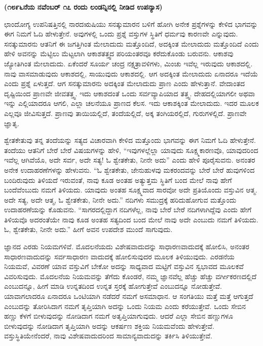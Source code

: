 \begin{center}
\textbf{(೧೮೯೬ನೆಯ ನವೆಂಬರ್​ ೧೭ ರಂದು ಲಂಡನ್ನಿನಲ್ಲಿ ನೀಡಿದ ಉಪನ್ಯಾಸ)}
\end{center}

ಛಾಂದೋಗ್ಯ ಉಪನಿಷತ್ತಿನಲ್ಲಿ ನಾರದಋಷಿಯು ಸನತ್ಕುಮಾರನ ಬಳಿಗೆ ಹೋಗಿ ಅನೇಕ ಪ್ರಶ್ನೆಗಳನ್ನು ಕೇಳಿದ ಭಾಗವನ್ನು ಈಗ ನಿಮಗೆ ಓದಿ ಹೇಳುತ್ತೇನೆ. ಅವುಗಳಲ್ಲಿ ಒಂದು ಪ್ರಶ್ನೆ ವಸ್ತುಗಳ ಸ್ಥಿತಿಗೆ ಧರ್ಮವು ಕಾರಣವೇ ಎನ್ನುವುದು. ಸನತ್ಕುಮಾರನು ಆತನಿಗೆ ಈ ಜಗತ್ತಿಗಿಂತ ಮೇಲಾದುದು ಮತ್ತೊಂದಿದೆ, ಅದಕ್ಕಿಂತ ಮೇಲಾದುದು ಮತ್ತೊಂದಿದೆ ಎಂದು ಹೇಳಿ ಅವನನ್ನು ಮೆಟ್ಟಿಲು ಮೆಟ್ಟಲಾಗಿ ಆಕಾಶತತ್ತ್ವದ ಪರಿಯಂತರವೂ ಕರೆದುಕೊಂಡು ಬರುವನು. ಆಕಾಶವು ಜ್ಯೋತಿಗಿಂತ ಮೇಲಾದುದು. ಏಕೆಂದರೆ ಸೂರ್ಯ ಚಂದ್ರ ನಕ್ಷತ್ರಾವಳಿಗಳು, ಮಿಂಚು ಇವೆಲ್ಲ ಇರುವುದು ಆಕಾಶದಲ್ಲಿ. ನಾವು ವಾಸಮಾಡುವುದು ಆಕಾಶದಲ್ಲಿ, ಸಾಯುವುದು ಆಕಾಶದಲ್ಲಿ. ಆಗ ಅದಕ್ಕಿಂತ ಮೇಲಾದುದು ಏನಾದರೂ ಇದೆಯೆ ಎಂದು ಪ್ರಶ್ನೆ ಏಳುತ್ತದೆ. ಆಗ ಸನತ್ಕುಮಾರನು ಅದಕ್ಕಿಂತ ಮೇಲಾದುದು ಪ್ರಾಣ ಎಂದು ಹೇಳುತ್ತಾನೆ. ವೇದಾಂತದ ದೃಷ್ಟಿಯಿಂದ ಪ್ರಾಣವೇ ಜೀವತತ್ತ್ವ. ಇದು ಆಕಾಶದಂತೆ ಒಂದು ಸರ್ವವ್ಯಾಪಿಯಾದ ತತ್ತ್ವ. ದೇಹದಲ್ಲಿಯಾಗಲೀ ಅಥವಾ ಇನ್ನು ಎಲ್ಲಿಯಾದರೂ ಆಗಲಿ, ಎಲ್ಲಾ ಚಲನೆಯೂ ಪ್ರಾಣದ ಕೆಲಸ. ಇದು ಆಕಾಶಕ್ಕಿಂತ ಮೇಲಾದುದು. ಇದರ ಮೂಲಕ ಎಲ್ಲವೂ ಜೀವಿಸುತ್ತದೆ. ಪ್ರಾಣವು ತಾಯಿಯಲ್ಲಿದೆ, ತಂದೆಯಲ್ಲಿದೆ, ಅಕ್ಕ ತಂಗಿಯರಲ್ಲಿದೆ, ಗುರುಗಳಲ್ಲಿದೆ. ಪ್ರಾಣವೇ ಜ್ಞಾತೃ.

ಶ್ವೇತಕೇತುವು ತನ್ನ ತಂದೆಯನ್ನು ಸತ್ಯದ ವಿಚಾರವಾಗಿ ಕೇಳಿದ ಮತ್ತೊಂದು ಭಾಗವನ್ನು ಈಗ ನಿಮಗೆ ಓದಿ ಹೇಳುತ್ತೇನೆ. ತಂದೆಯು ಆತನಿಗೆ ಬೇರೆ ಬೇರೆ ವಿಷಯಗಳನ್ನು ಹೇಳಿ, “ಇವುಗಳಲ್ಲೆಲ್ಲಾ ಯಾವುದು ಸೂಕ್ಷ್ಮಕಾರಣವೊ, ಯಾವುದರಿಂದ ಇವೆಲ್ಲ ಆಗಿವೆಯೊ, ಅದೇ ಸರ್ವ, ಅದೇ ಸತ್ಯ! ಓ ಶ್ವೇತಕೇತು, ನೀನೇ ಅದು” ಎಂದು ಹೇಳಿ ಪೂರೈಸುವನು. ಅನಂತರ ಅನೇಕ ಉದಾಹರಣೆಗಳನ್ನು ಹೇಳುವನು. “ಓ ಶ್ವೇತಕೇತು, ಜೇನುಹುಳವು ಮಕರಂದವನ್ನು ಬೇರೆ ಬೇರೆ ಹುವುಗಳಿಂದ ಬಂದಿರುವುದು ತಿಳಿಯದೆ ಇರುವಂತೆ, ನಾವು ಕೂಡ ಅಂತಹ ಅತ್ಯುತ್ತಮ ಸ್ಥಿತಿಗೆ ಬಂದ ಮೇಲೆ ನಾವು ಹೇಗೆ ಬಂದೆವೆಂಬುದು ನಮಗೆ ತಿಳಿಯದು. ಯಾವುದು ಅಂತಹ ಸೂಕ್ಷ್ಮವಾದ ಸಾರವೋ ಅದೇ ಪ್ರತಿಯೊಂದು ವಸ್ತುವಿನ ಆತ್ಮ. ಅದೇ ಸತ್ಯ, ಅದೇ ಆತ್ಮ, ಓ ಶ್ವೇತಕೇತು, ನೀನೇ ಅದು.” ನದಿಗಳು ಸಮುದ್ರಕ್ಕೆ ಹರಿದುಹೋಗುವ ಮತ್ತೊಂದು ಉದಾಹರಣೆಯನ್ನು ಕೊಡುವನು. “ಸಾಗರದಲ್ಲಿದ್ದಾಗ ನದಿಗಳೆಲ್ಲ, ನಾವು ಬೇರೆ ಬೇರೆ ನದಿಗಳಾಗಿದ್ದೆವು ಎಂದು ಹೇಗೆ ತಿಳಿಯವೊ ಅದರಂತೆಯೇ ನಾವು ಕೂಡ ಅಂತಹ ಸತ್ಯದಿಂದ ಬಂದ ಮೇಲೆ ನಾವು ಅದೇ ಎಂಬುದು ನಮಗೆ ತಿಳಿಯದು. ಓ, ಶ್ವೇತಕೇತು, ನೀನೇ ಅದು.” ಹೀಗೆ ಅವನ ಉಪದೇಶ ಮುಂದೆ ಸಾಗುವುದು.

ಜ್ಞಾನದ ಎರಡು ನಿಯಮಗಳಿವೆ. ಮೊದಲನೆಯದು ವಿಶೇಷವಾದುದನ್ನು ಸಾಧಾರಣವಾದುದಕ್ಕೆ ಹೋಲಿಸಿ, ಅನಂತರ ಸಾಧಾರಣವಾದುದನ್ನು ಸರ್ವಸಾಧಾರಣ ವಾದುದಕ್ಕೆ ಹೋಲಿಸುವುದರ ಮೂಲಕ ತಿಳಿಯುವುದು. ಎರಡನೆಯ ನಿಯಮವೆ, ವಿವರಣೆ ಯಾವ ವಸ್ತುವಿಗೆ ಬೇಕೋ ಅದನ್ನು ಸಾಧ್ಯವಾದ ಮಟ್ಟಿಗೆ ವಸ್ತುವಿನ ಸ್ವಭಾವದ ಮೂಲಕವೆ ವಿವರಿಸುವುದು. ಮೊದಲನೆಯ ನಿಯಮವನ್ನು ತೆಗೆದು ಕೊಂಡರೆ, ನಮ್ಮ ಜ್ಞಾನವೆಲ್ಲ ಹೆಚ್ಚು ಹೆಚ್ಚು ವರ್ಗೀಕರಣದಲ್ಲಿದೆ ಎಂಬುದನ್ನೂ, ಹೀಗೆ ಮಾಡಿ ಉನ್ನತದಿಂದ ಉನ್ನತ ಸ್ತರಕ್ಕೆ ಹೋಗುತ್ತೇವೆ ಎಂಬುದನ್ನೂ ನೋಡುತ್ತೇವೆ. ಯಾವಾಗಲಾದರೂ ಏನಾದರೂ ಒಂಟಿಯಾಗಿ ನಡೆದರೆ ನಮಗೆ ಅಸಮಾಧಾನ. ಆ ಸಂಗತಿಯು ಮತ್ತೆ ಮತ್ತೆ ಆಗುತ್ತದೆ ಎಂಬುದನ್ನು ತೋರಿಸಿದಾಗ ನಮಗೆ ತೃಪ್ತಿಯಾಗಿ ಅದನ್ನು ಒಂದು ನಿಯಮ ಎಂದು ಕರೆಯುತ್ತೇವೆ. ಒಂದು ಸೇಬಿನ ಹಣ್ಣು ಕೆಳಗೆ ಬೀಳುವುದನ್ನು ನೋಡಿದಾಗ ನಮಗೆ ಅತೃಪ್ತಿಯಾಗುವುದು. ಆದರೆ ಎಲ್ಲಾ ಸೇಬಿನ ಹಣ್ಣುಗಳೂ ಬೀಳುವುದನ್ನು ನೋಡಿದಾಗ ತೃಪ್ತಿಯಾಗಿ ಅದನ್ನು ಆಕರ್ಷಣ ಶಕ್ತಿಯ ನಿಯಮವೆಂದು ಹೇಳುತ್ತೇವೆ. ವಸ್ತುಸ್ಥಿತಿಯೇನೆಂದರೆ, ನಾವು ವಿಶೇಷವಾದುದರಿಂದ ಸಾಮಾನ್ಯವಾದುದನ್ನು ತರ್ಕಿಸಿ ತಿಳಿಯುತ್ತೇವೆ.

